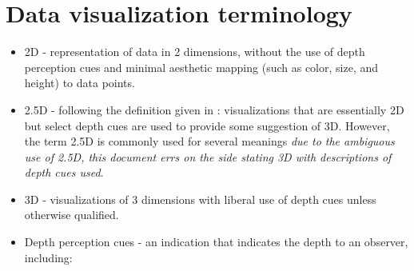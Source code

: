 \documentclass{template/monashthesis}
\begin{document}
\hypertarget{sec:terminology}{%
\section{Data visualization terminology}\label{sec:terminology}}

\begin{itemize}
\tightlist
\item
  2D - representation of data in 2 dimensions, without the use of depth perception cues and minimal aesthetic mapping (such as color, size, and height) to data points.
\item
  2.5D - following the definition given in \textcite{ware_designing_2000}: visualizations that are essentially 2D but select depth cues are used to provide some suggestion of 3D. However, the term 2.5D is commonly used for several meanings \emph{due to the ambiguous use of 2.5D, this document errs on the side stating 3D with descriptions of depth cues used}.
\item
  3D - visualizations of 3 dimensions with liberal use of depth cues unless otherwise qualified.
\item
  Depth perception cues - an indication that indicates the depth to an observer, including:


\end{itemize}
\end{document}
